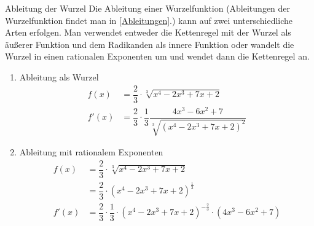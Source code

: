  \begin{bem}{Ableitung der Wurzel}{}
Die Ableitung einer Wurzelfunktion (Ableitungen der Wurzelfunktion findet man in \ref{Ableitungen}.) kann auf zwei unterschiedliche Arten erfolgen. 
Man verwendet entweder die Kettenregel mit der Wurzel als äußerer Funktion und dem Radikanden als innere Funktion oder wandelt die Wurzel in einen rationalen Exponenten um und wendet dann die Kettenregel an.
\begin{enumerate}
    \item Ableitung als Wurzel
    \begin{equation*}
        \begin{split}
            f(x) &= \dfrac{2}{3} \cdot \sqrt[3]{x^4-2x^3 +7x+2}\\
            f'(x) &= \dfrac{2}{3} \cdot \dfrac{1}{3} \dfrac{4x^3-6x^2+7}{\sqrt[3]{(x^4-2x^3 +7x+2)^2}} 
        \end{split}
    \end{equation*}
    \item Ableitung mit rationalem Exponenten
    \begin{equation*}
        \begin{split}
            f(x) &= \dfrac{2}{3} \cdot \sqrt[3]{x^4-2x^3 +7x+2}\\
            &= \dfrac{2}{3} \cdot (x^4-2x^3+7x+2)^{\frac{1}{3}}\\
            f'(x) &= \dfrac{2}{3} \cdot \dfrac{1}{3} \cdot (x^4-2x^3+7x+2)^{-\frac{2}{3}} \cdot (4x^3-6x^2+7)
        \end{split}
    \end{equation*}
\end{enumerate}
 \end{bem}
